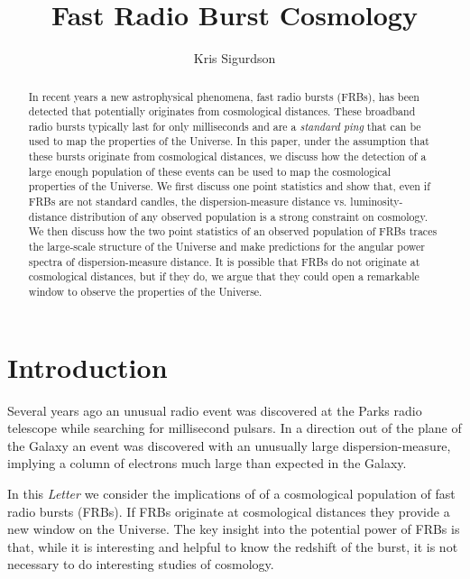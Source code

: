 \documentclass[twocolumn,prd,noshowpacs,nofootinbib,amsmath,amssymb]{revtex4}
\begin{document}
\title{Fast Radio Burst Cosmology}

\author{Kris Sigurdson}


\begin{abstract}
In recent years a new astrophysical phenomena, fast radio bursts (FRBs), has been detected that potentially originates from cosmological distances.  These broadband radio bursts  typically last for only milliseconds and are a \emph{standard ping} that can be used to map the properties of the Universe.  In this paper,  under the assumption that these bursts originate from cosmological distances, we discuss how the detection of a large enough population of these events can be used to map the cosmological properties of the Universe.    We first discuss one point statistics and show that, even if FRBs are not standard candles, the dispersion-measure distance vs. luminosity-distance distribution of any observed population is a strong constraint on cosmology.  We then discuss how the two point statistics of an observed population of FRBs traces the large-scale structure of the Universe and make predictions for the angular power spectra of dispersion-measure distance.  It is possible that FRBs do not originate at cosmological distances, but if they do, we argue that they could open a remarkable window to observe the properties of the Universe.
\end{abstract}

\maketitle

%
%

\section{Introduction}
Several years ago an unusual radio event was discovered at the Parks radio telescope while searching for millisecond pulsars.  In a direction out of the plane of the Galaxy an event was discovered with an unusually large dispersion-measure, implying a column of electrons much large than expected in the Galaxy.

In this \emph{ Letter} we consider the implications of of a cosmological population of fast radio bursts (FRBs). 
 If FRBs originate at cosmological distances they provide a new window on the Universe. The key insight into the potential power of FRBs is that, while it is interesting and helpful to know the redshift of the burst, it is not necessary to do interesting studies of cosmology.
 
\end{document}
